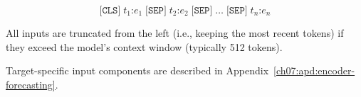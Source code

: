 \begin{equation}
\texttt{[CLS]} \; t_1\texttt{:}e_1 \; \texttt{[SEP]} \; t_2\texttt{:}e_2 \; \texttt{[SEP]} \; \dots \; \texttt{[SEP]} \; t_n\texttt{:}e_n
\end{equation}

All inputs are truncated from the left (i.e., keeping the most recent tokens) if they exceed the model's context window (typically 512 tokens).

Target-specific input components are described in Appendix~\ref{ch07:apd:encoder-forecasting}.
\par
